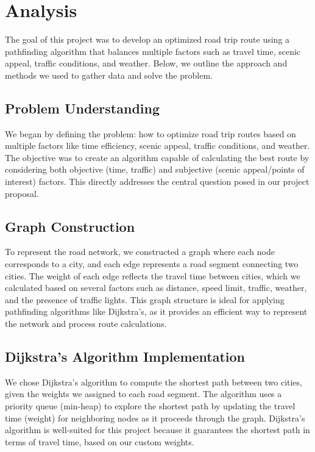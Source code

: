 \documentclass{article}
\begin{document}
\newpage
\section{Analysis}

The goal of this project was to develop an optimized road trip route using a pathfinding algorithm that balances multiple factors such as travel time, scenic appeal, traffic conditions, and weather. Below, we outline the approach and methods we used to gather data and solve the problem.

\subsection{Problem Understanding}
We began by defining the problem: how to optimize road trip routes based on multiple factors like time efficiency, scenic appeal, traffic conditions, and weather. The objective was to create an algorithm capable of calculating the best route by considering both objective (time, traffic) and subjective (scenic appeal/points of interest) factors. This directly addresses the central question posed in our project proposal.

\subsection{Graph Construction}
To represent the road network, we constructed a graph where each node corresponds to a city, and each edge represents a road segment connecting two cities. The weight of each edge reflects the travel time between cities, which we calculated based on several factors such as distance, speed limit, traffic, weather, and the presence of traffic lights. This graph structure is ideal for applying pathfinding algorithms like Dijkstra’s, as it provides an efficient way to represent the network and process route calculations.

\subsection{Dijkstra’s Algorithm Implementation}
We chose Dijkstra’s algorithm to compute the shortest path between two cities, given the weights we assigned to each road segment. The algorithm uses a priority queue (min-heap) to explore the shortest path by updating the travel time (weight) for neighboring nodes as it proceeds through the graph. Dijkstra’s algorithm is well-suited for this project because it guarantees the shortest path in terms of travel time, based on our custom weights.
\end{document}
